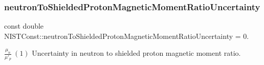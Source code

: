 \subsubsection{\texorpdfstring{neutron\+To\+Shielded\+Proton\+Magnetic\+Moment\+Ratio\+Uncertainty}{neutronToShieldedProtonMagneticMomentRatioUncertainty}}
{\footnotesize\ttfamily const double N\+I\+S\+T\+Const\+::neutron\+To\+Shielded\+Proton\+Magnetic\+Moment\+Ratio\+Uncertainty = 0.}

$\frac{\mu_n}{\mu'_p} \ (1)$ Uncertainty in neutron to shielded proton magnetic moment ratio. 